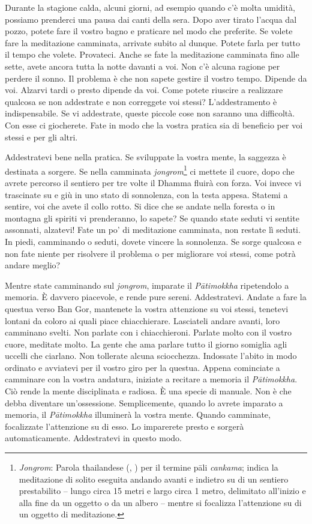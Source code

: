 Durante la stagione calda, alcuni giorni, ad esempio quando c'è molta
umidità, possiamo prenderci una pausa dai canti della sera. Dopo aver
tirato l'acqua dal pozzo, potete fare il vostro bagno e praticare nel
modo che preferite. Se volete fare la meditazione camminata, arrivate
subito al dunque. Potete farla per tutto il tempo che volete. Provateci.
Anche se fate la meditazione camminata fino alle sette, avete ancora
tutta la notte davanti a voi. Non c'è alcuna ragione per perdere il
sonno. Il problema è che non sapete gestire il vostro tempo. Dipende da
voi. Alzarvi tardi o presto dipende da voi. Come potete riuscire a
realizzare qualcosa se non addestrate e non correggete voi stessi?
L'addestramento è indispensabile. Se vi addestrate, queste piccole cose
non saranno una difficoltà. Con esse ci giocherete. Fate in modo che la
vostra pratica sia di beneficio per voi stessi e per gli altri.

Addestratevi bene nella pratica. Se sviluppate la vostra mente, la
saggezza è destinata a sorgere. Se nella camminata
\emph{jongrom}\footnote{\emph{Jongrom}: Parola thailandese (,
  ) per il termine pāli \emph{cankama}; indica la meditazione
  di solito eseguita andando avanti e indietro su di un sentiero
  prestabilito -- lungo circa 15 metri e largo circa 1 metro, delimitato
  all'inizio e alla fine da un oggetto o da un albero -- mentre si
  focalizza l'attenzione su di un oggetto di meditazione.} ci mettete il
cuore, dopo che avrete percorso il sentiero per tre volte il Dhamma
fluirà con forza. Voi invece vi trascinate su e giù in uno stato di
sonnolenza, con la testa appesa. Statemi a sentire, voi che avete il
collo rotto. Si dice che se andate nella foresta o in montagna gli
spiriti vi prenderanno, lo sapete? Se quando state seduti vi sentite
assonnati, alzatevi! Fate un po' di meditazione camminata, non restate
lì seduti. In piedi, camminando o seduti, dovete vincere la sonnolenza.
Se sorge qualcosa e non fate niente per risolvere il problema o per
migliorare voi stessi, come potrà andare meglio?

Mentre state camminando sul \emph{jongrom}, imparate il
\emph{Pātimokkha} ripetendolo a memoria. È davvero piacevole, e rende
pure sereni. Addestratevi. Andate a fare la questua verso Ban Gor,
mantenete la vostra attenzione su voi stessi, tenetevi lontani da coloro
ai quali piace chiacchierare. Lasciateli andare avanti, loro camminano
svelti. Non parlate con i chiacchieroni. Parlate molto con il vostro
cuore, meditate molto. La gente che ama parlare tutto il giorno somiglia
agli uccelli che ciarlano. Non tollerate alcuna sciocchezza. Indossate
l'abito in modo ordinato e avviatevi per il vostro giro per la questua.
Appena cominciate a camminare con la vostra andatura, iniziate a
recitare a memoria il \emph{Pātimokkha}. Ciò rende la mente disciplinata
e radiosa. È una specie di manuale. Non è che debba diventare
un'ossessione. Semplicemente, quando lo avrete imparato a memoria, il
\emph{Pātimokkha} illuminerà la vostra mente. Quando camminate,
focalizzate l'attenzione su di esso. Lo imparerete presto e sorgerà
automaticamente. Addestratevi in questo modo.

